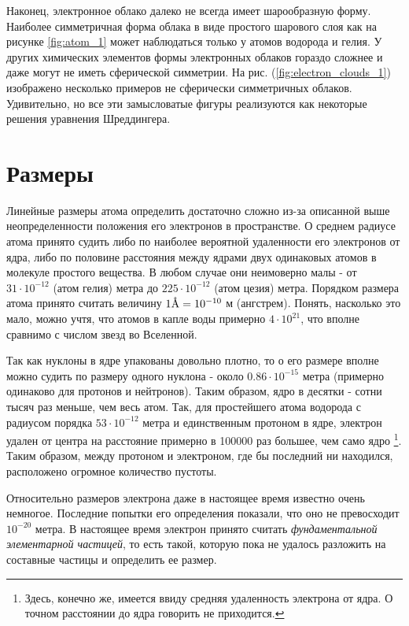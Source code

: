 Наконец, электронное облако далеко не всегда имеет шарообразную форму.
Наиболее симметричная форма облака в виде простого шарового слоя как на рисунке \ref{fig:atom_1} может наблюдаться только у атомов водорода и гелия.
У других химических элементов формы электронных облаков гораздо сложнее и даже могут не иметь сферической симметрии.
На рис. (\ref{fig:electron_clouds_1}) изображено несколько примеров не сферически симметричных облаков.
Удивительно, но все эти замысловатые фигуры реализуются как некоторые решения уравнения Шреддингера.


\section*{Размеры}

Линейные размеры атома определить достаточно сложно из-за описанной выше неопределенности положения его электронов в пространстве.
О среднем радиусе атома принято судить либо по наиболее вероятной удаленности его электронов от ядра, либо по половине расстояния между ядрами двух одинаковых атомов в молекуле простого вещества.
В любом случае они неимоверно малы - от $31\cdot 10^{-12}$ (атом гелия) метра до $225\cdot 10^{-12}$ (атом цезия) метра.
Порядком размера атома принято считать величину $1\mbox{\normalfont\AA} = 10^{-10}$ м (ангстрем).
Понять, насколько это мало, можно учтя, что атомов в капле воды примерно $4\cdot 10^{21}$, что вполне сравнимо с числом звезд во Вселенной.

Так как нуклоны в ядре упакованы довольно плотно, то о его размере вполне можно судить по размеру одного нуклона - около $0.86\cdot 10^{-15}$ метра (примерно одинаково для протонов и нейтронов). 
Таким образом, ядро в десятки - сотни тысяч раз меньше, чем весь атом.
Так, для простейшего атома водорода с радиусом порядка $53\cdot 10^{-12}$ метра и единственным протоном в ядре, электрон удален от центра на расстояние примерно в 100000 раз большее, чем само ядро \footnote{%
    Здесь, конечно же, имеется ввиду средняя удаленность электрона от ядра.
    О точном расстоянии до ядра говорить не приходится.}.
Таким образом, между протоном и электроном, где бы последний ни находился, расположено огромное количество пустоты.

Относительно размеров электрона даже в настоящее время известно очень немногое.
Последние попытки его определения показали, что оно не превосходит $10^{-20}$ метра.
В настоящее время электрон принято считать \textit{фундаментальной элементарной частицей}, то есть такой, которую пока не удалось разложить на составные частицы и определить ее размер.


